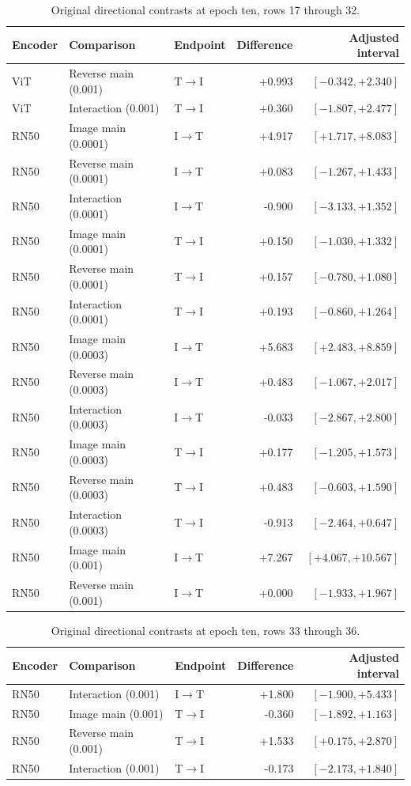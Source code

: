 \begin{table}[t]
\centering
\small
\setlength{\tabcolsep}{3pt}
\begin{tabular}{lllrr}
\toprule
Encoder & Comparison & Endpoint & Difference & Adjusted interval\\
\midrule
ViT & Reverse main (0.001) & T$\to$I & +0.993 & $[-0.342,+2.340]$ \\
ViT & Interaction (0.001) & T$\to$I & +0.360 & $[-1.807,+2.477]$ \\
RN50 & Image main (0.0001) & I$\to$T & +4.917 & $[+1.717,+8.083]$ \\
RN50 & Reverse main (0.0001) & I$\to$T & +0.083 & $[-1.267,+1.433]$ \\
RN50 & Interaction (0.0001) & I$\to$T & -0.900 & $[-3.133,+1.352]$ \\
RN50 & Image main (0.0001) & T$\to$I & +0.150 & $[-1.030,+1.332]$ \\
RN50 & Reverse main (0.0001) & T$\to$I & +0.157 & $[-0.780,+1.080]$ \\
RN50 & Interaction (0.0001) & T$\to$I & +0.193 & $[-0.860,+1.264]$ \\
RN50 & Image main (0.0003) & I$\to$T & +5.683 & $[+2.483,+8.859]$ \\
RN50 & Reverse main (0.0003) & I$\to$T & +0.483 & $[-1.067,+2.017]$ \\
RN50 & Interaction (0.0003) & I$\to$T & -0.033 & $[-2.867,+2.800]$ \\
RN50 & Image main (0.0003) & T$\to$I & +0.177 & $[-1.205,+1.573]$ \\
RN50 & Reverse main (0.0003) & T$\to$I & +0.483 & $[-0.603,+1.590]$ \\
RN50 & Interaction (0.0003) & T$\to$I & -0.913 & $[-2.464,+0.647]$ \\
RN50 & Image main (0.001) & I$\to$T & +7.267 & $[+4.067,+10.567]$ \\
RN50 & Reverse main (0.001) & I$\to$T & +0.000 & $[-1.933,+1.967]$ \\
\bottomrule
\end{tabular}
\caption{Original directional contrasts at epoch ten, rows 17 through 32.}\label{tab:directional16}
\end{table}


\begin{table}[t]
\centering
\small
\setlength{\tabcolsep}{3pt}
\begin{tabular}{lllrr}
\toprule
Encoder & Comparison & Endpoint & Difference & Adjusted interval\\
\midrule
RN50 & Interaction (0.001) & I$\to$T & +1.800 & $[-1.900,+5.433]$ \\
RN50 & Image main (0.001) & T$\to$I & -0.360 & $[-1.892,+1.163]$ \\
RN50 & Reverse main (0.001) & T$\to$I & +1.533 & $[+0.175,+2.870]$ \\
RN50 & Interaction (0.001) & T$\to$I & -0.173 & $[-2.173,+1.840]$ \\
\bottomrule
\end{tabular}
\caption{Original directional contrasts at epoch ten, rows 33 through 36.}\label{tab:directional32}
\end{table}


